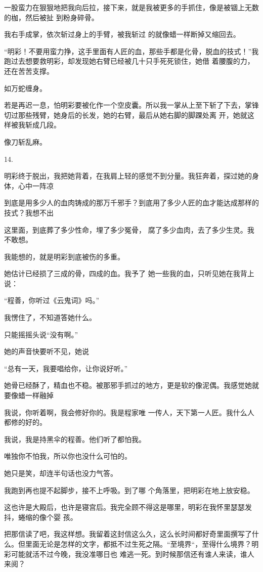 \documentclass{article}
\begin{document}
一股蛮力在狠狠地把我向后拉，接下来，就是我被更多的手抓住，像是被锢上无数的枷，然后被扯
到粉身碎骨。 

我右手成掌，依次斩过身上的手臂，被我斩过
的就像蜡一样断掉又缩回去。 

“明彩！不要用蛮力挣，这手里面有人匠的血，那些手都是化骨，脱血的技式！”我跑过去想要救明彩，却发现她右臂已经被几十只手死死锁住，她借
着腰腹的力，还在苦苦支撑。 

\newpage


如万蛇缠身。 

若是再迟一息，怕明彩要被化作一个空皮囊。所以我一掌从上至下斩了下去，掌锋切过那些残臂，她身后的长发，她的右臂，最后从她右脚的脚踝处离
开，她就这样被我斩成几段。 


像刀斩乱麻。 


14. 

明彩终于脱出，我把她背着，在我肩上轻的感觉不到分量。我狂奔着，探过她的身体，心中一阵凉

到底是用多少人的血肉铸成的那万千邪手？到底用了多少人匠的血才能达成那样的技式？我想不出

这里面，到底葬了多少性命，埋了多少冤骨，
腐了多少血肉，去了多少生灵。我不敢想。 


\newpage

我能想的，就是明彩到底被伤的多重。 

她估计已经损了三成的骨，四成的血。我予了
她一些我的血，只听见她在我背上说： 


“程善，你听过《云鬼词》吗。” 


我愣住了，不知道答她什么。 


只能摇摇头说“没有啊。” 


她的声音快要听不见，她说 


“总有一天，我要唱给你，让你说好听。” 

她骨已经酥了，精血也不稳。被那邪手抓过的地方，更是软的像泥偶。我感觉她就要像蜡一样融掉

我说，你听着啊，我会修好你的。我是程家唯
一传人，天下第一人匠。我什么人都修的好的。 

我说，我是持黑伞的程善。他们听了都怕我。
\newpage

唯独你不怕我，所以你也没什么可怕的。 


她只是笑，却连半句话也没力气答。 

我跑到再也提不起脚步，接不上呼吸。到了哪
个角落里，把明彩在地上放安稳。 

这也许是大殿后，也许是寝宫后。我完全顾不得这是哪里，明彩在我怀里瑟瑟发抖，蜷缩的像个婴
孩。 

把那信读了吧，我这样想。我留着这封信这么久，这么长时间都好奇里面撰写了什么。但里面无论是怎样的文字，都抵不过生死之隔。“至境界“，至得什么境界？明彩可能就活不过今晚，我没准哪日也
难逃一死。到时候那信还有谁人来读，谁人来阅？ 
\end{document}
